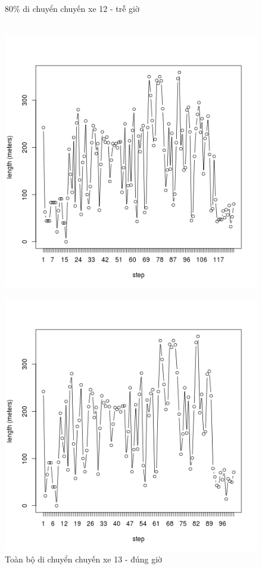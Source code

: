 \documentclass[a4paper, 13pt]{report}
\begin{document}
\begin{figure}[!htb]
  \caption*{80\% di chuyển chuyến xe 12 - trễ giờ}
\endminipage\\
  \includegraphics[width=\linewidth]{test_100_13}
  \caption*{Toàn bộ di chuyển chuyến xe 13 - đúng giờ}
\endminipage
{}
  \includegraphics[width=\linewidth]{test_80_13}

\end{figure}
\end{document}
